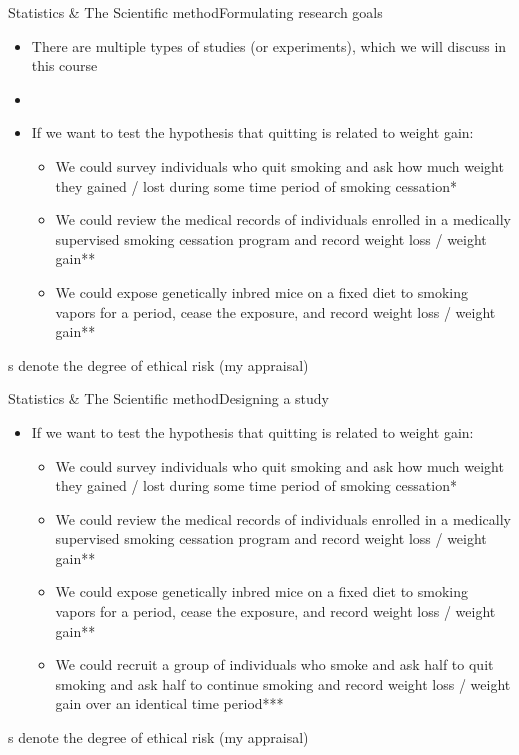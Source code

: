 \documentclass[xcolor=dvipsnames]{beamer}
\begin{document}
\begin{frame}{Statistics \& The Scientific method}{Formulating research goals}
	\begin{itemize}
		\item There are multiple types of studies (or experiments), which we will discuss in this course
		\item[]
		\item If we want to test the hypothesis that quitting is related to weight gain: \pause
		\begin{itemize}
			\item We could survey individuals who quit smoking and ask how much weight they gained / lost during some time period of smoking cessation* \pause
			\item We could review the medical records of individuals enrolled in a medically supervised smoking cessation program and record weight loss / weight gain** \pause
			\item We could expose genetically inbred mice on a fixed diet to smoking vapors for a period, cease the exposure, and record weight loss / weight gain** \pause
		\end{itemize}
	\end{itemize}
{\tiny *s denote the degree of ethical risk (my appraisal)}
\end{frame}

\begin{frame}{Statistics \& The Scientific method}{Designing a study}
	\begin{itemize}
		\item If we want to test the hypothesis that quitting is related to weight gain:
		\begin{itemize}
			\item We could survey individuals who quit smoking and ask how much weight they gained / lost during some time period of smoking cessation*
			\item We could review the medical records of individuals enrolled in a medically supervised smoking cessation program and record weight loss / weight gain**
			\item We could expose genetically inbred mice on a fixed diet to smoking vapors for a period, cease the exposure, and record weight loss / weight gain**
			\item We could recruit a group of individuals who smoke and ask half to quit smoking and ask half to continue smoking and record weight loss / weight gain over an identical time period***
		\end{itemize}
	\end{itemize}
{\tiny *s denote the degree of ethical risk (my appraisal)}
\end{frame}
\end{document}
